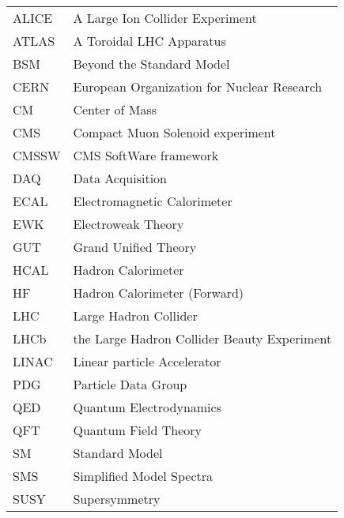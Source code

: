 


\begin{abbreviations}
\begin{longtable}[l]{lp{10cm}}
ALICE & A Large Ion Collider Experiment\\
ATLAS & A Toroidal LHC Apparatus\\                 
BSM   & Beyond the Standard Model\\
CERN  & European Organization for Nuclear Research\\
CM    & Center of Mass\\
CMS   & Compact Muon Solenoid experiment\\
CMSSW & CMS SoftWare framework\\
DAQ   & Data Acquisition\\
ECAL  & Electromagnetic Calorimeter\\
EWK   & Electroweak Theory\\
GUT   & Grand Unified Theory\\
HCAL  & Hadron Calorimeter\\
HF    & Hadron Calorimeter (Forward)\\
LHC   & Large Hadron Collider\\
LHCb  & the Large Hadron Collider Beauty Experiment\\
LINAC & Linear particle Accelerator\\
PDG   & Particle Data Group\\
QED   & Quantum Electrodynamics\\
QFT   & Quantum Field Theory\\
SM    & Standard Model\\
SMS   & Simplified Model Spectra\\
SUSY  & Supersymmetry\\
\end{longtable}

\end{abbreviations}
%
%
%

